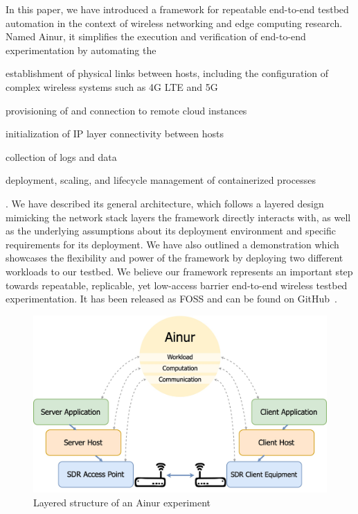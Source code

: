 In this paper, we have introduced a framework for repeatable end-to-end testbed automation in the context of wireless networking and edge computing research.
Named Ainur, it simplifies the execution and verification of end-to-end experimentation by automating the
\begin{enumerate*}[itemjoin={{; }}, itemjoin*={{; and }}]
    \item establishment of physical links between hosts, including the configuration of complex wireless systems such as 4G \ac{LTE} and 5G
    \item provisioning of and connection to remote cloud instances
    \item initialization of \ac{IP} layer connectivity between hosts
    \item collection of logs and data
    \item deployment, scaling, and lifecycle management of containerized processes
\end{enumerate*}.
We have described its general architecture, which follows a layered design mimicking the network stack layers the framework directly interacts with, as well as the underlying assumptions about its deployment environment and specific requirements for its deployment.
We have also outlined a demonstration which showcases the flexibility and power of the framework by deploying two different workloads to our testbed.
We believe our framework represents an important step towards repeatable, replicable, yet low-access barrier end-to-end wireless testbed experimentation.
It has been released as \ac{FOSS} and can be found on GitHub~\cite{ainur:github}.\\


\begin{figure}[t]
    \centering
    \includegraphics[width=0.9\linewidth]{publications/2022Ainur/figures/overview.jpg}
    \caption{Layered structure of an Ainur experiment}\label{fig:overview}
\end{figure}

